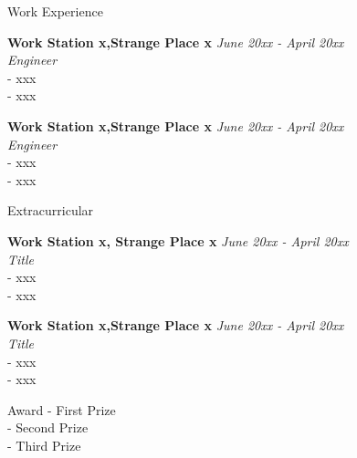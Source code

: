 \documentclass{resume} %
\begin{document}
\begin{rSection}{Work Experience}


{\bf Work Station x,Strange Place x} \hfill {\em June 20xx - April 20xx} 
\\{\textit{ Engineer}}
\\- xxx
\\- xxx

{\bf Work Station x,Strange Place x} \hfill {\em June 20xx - April 20xx} 
\\{\textit{ Engineer}}
\\- xxx
\\- xxx

% 



\end{rSection}


\begin{rSection}{Extracurricular }


{\bf Work Station x, Strange Place x} \hfill {\em June 20xx - April 20xx} 
\\{\textit{ Title}}
\\- xxx
\\- xxx

{\bf Work Station x,Strange Place x} \hfill {\em June 20xx - April 20xx} 
\\{\textit{ Title}}
\\- xxx
\\- xxx

% 



\end{rSection}
\begin{rSection}{Award}
- First Prize\\
- Second Prize\\
- Third Prize\\
\end{rSection}





\end{document}
